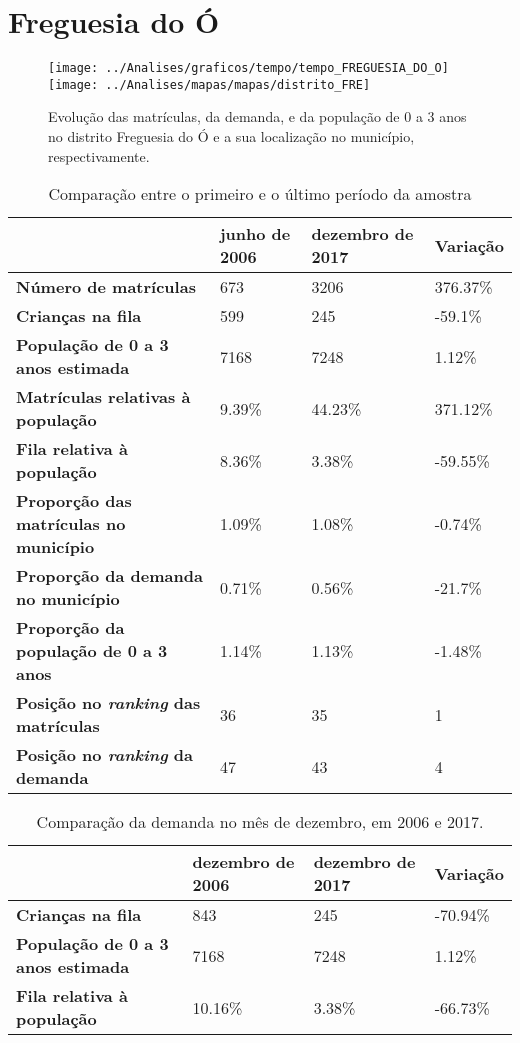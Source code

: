 \section{Freguesia do Ó}
\begin{figure}[H]
	\centering
	\texttt{[image: ../Analises/graficos/tempo/tempo\_FREGUESIA\_DO\_O]}
	\texttt{[image: ../Analises/mapas/mapas/distrito\_FRE]}
	\caption{Evolução das matrículas, da demanda, e da população de 0 a 3 anos no distrito Freguesia do Ó e a sua localização no município, respectivamente.}
\end{figure}
\begin{table}[H]
	\begin{tabular}{|l|l|l|l|}
		\hline
		\textbf{}                                      & \textbf{junho de 2006}       & \textbf{dezembro de 2017}    & \textbf{Variação} \\ \hline
		\textbf{Número de matrículas}                  & 673 & 3206 & 376.37\% \\ \hline
		\textbf{Crianças na fila}                      & 599 & 245 & -59.1\% \\ \hline
		\textbf{População de 0 a 3 anos estimada}      & 7168 & 7248 & 1.12\% \\ \hline
		\textbf{Matrículas relativas à população}      & 9.39\% & 44.23\% & 371.12\% \\ \hline
		\textbf{Fila relativa à população}             & 8.36\% & 3.38\% & -59.55\% \\ \hline
		\textbf{Proporção das matrículas no município} & 1.09\% & 1.08\% & -0.74\% \\ \hline
		\textbf{Proporção da demanda no município}     & 0.71\% & 0.56\% & -21.7\% \\ \hline
		\textbf{Proporção da população de 0 a 3 anos}  & 1.14\% & 1.13\% & -1.48\% \\ \hline
		\textbf{Posição no \textit{ranking} das matrículas}     & 36 & 35 & 1 \\ \hline
		\textbf{Posição no \textit{ranking} da demanda}         & 47 & 43 & 4 \\ \hline
	\end{tabular}
	\caption{Comparação entre o primeiro e o último período da amostra}
\end{table}
\begin{table}[H]
	\begin{tabular}{|l|l|l|l|}
		\hline
		\textbf{}                                 & \textbf{dezembro de 2006} & \textbf{dezembro de 2017} & \textbf{Variação} \\ \hline
		\textbf{Crianças na fila}                      & 843 & 245 & -70.94\% \\ \hline
		\textbf{População de 0 a 3 anos estimada}      & 7168 & 7248 & 1.12\% \\ \hline
		\textbf{Fila relativa à população}             & 10.16\% & 3.38\% & -66.73\% \\ \hline
	\end{tabular}
	\caption{Comparação da demanda no mês de dezembro, em 2006 e 2017.}
\end{table}
